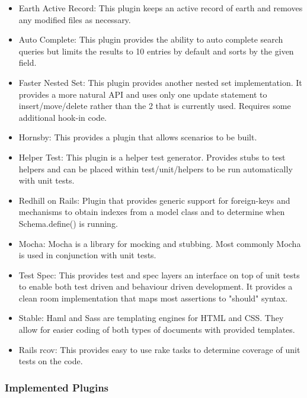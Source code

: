 \documentclass{article}
\begin{document}
\begin{itemize}
\item Earth Active Record:
This plugin keeps an active record of earth and removes any modified files as necessary. 

\item Auto Complete:
This plugin provides the ability to auto complete search queries but limits the results to 10 entries by default and sorts by the given field.
  
\item Faster Nested Set:
This plugin provides another nested set implementation. It provides a more natural API and uses only one update statement to insert/move/delete rather than the 2 that is currently used.
Requires some additional hook-in code.

\item Hornsby:
This provides a plugin that allows scenarios to be built.

\item Helper Test:
This plugin is a helper test generator. Provides stubs to test helpers and can be placed within test/unit/helpers to be run automatically with unit tests.

\item Redhill on Rails:
Plugin that provides generic support for foreign-keys and mechanisms to obtain indexes from a model class and to determine when Schema.define() is running.

\item Mocha:
Mocha is a library for mocking and stubbing. Most commonly Mocha is used in conjunction with unit tests.

\item Test Spec:
This provides test and spec layers an interface on top of unit tests to enable both test driven and behaviour driven development.
It provides a clean room implementation that maps most assertions to "should" syntax.

\item Stable:
Haml and Sass are templating engines for HTML and CSS. They allow for easier coding of both types of documents with provided templates.

\item Rails rcov:
This provides easy to use rake tasks to determine coverage of unit tests on the code.

\end{itemize}

\subsubsection{Implemented Plugins}
\end{document}
